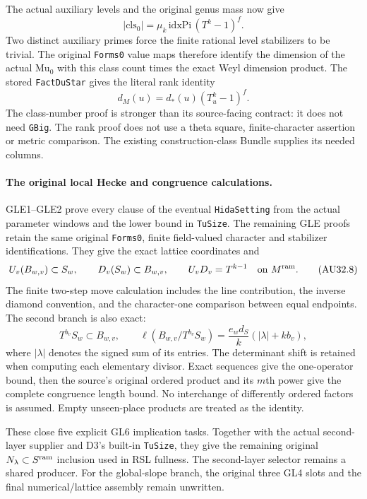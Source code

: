 The actual auxiliary levels and the original genus mass now give
\[
 |\mathrm{cls}_0|=\mu_k\,\mathrm{idxPi}\,(T^k-1)^f.
                                                               \tag{AU32.6}
\]
Two distinct auxiliary primes force the finite rational level
stabilizers to be trivial. The original \texttt{Forms0} value maps
therefore identify the dimension of the actual $\mathrm{Mu}_0$
with this class count times the exact Weyl dimension product.
The stored \texttt{FactDuStar} gives the literal rank identity
\[
                    d_M(u)=d_*(u)(T_u^k-1)^f.
                                                               \tag{AU32.7}
\]
The class-number proof is stronger than its source-facing contract:
it does not need \texttt{GBig}. The rank proof does not use a
theta square, finite-character assertion or metric comparison.
The existing construction-class Bundle supplies its needed columns.

\paragraph{The original local Hecke and congruence calculations.}
GLE1--GLE2 prove every clause of the eventual
\texttt{HidaSetting} from the actual parameter windows and the
lower bound in \texttt{TuSize}. The remaining GLE proofs retain
the same original \texttt{Forms0}, finite field-valued character
and stabilizer identifications. They give the exact lattice
coordinates and
\[
 U_v(B_{w,v})\subset S_w,\qquad D_v(S_w)\subset B_{w,v},
 \qquad U_vD_v=T^{k-1}\quad\hbox{on }M^{\rm ram}.
                                                               \tag{AU32.8}
\]
The finite two-step move calculation includes the line contribution,
the inverse diamond convention, and the character-one comparison
between equal endpoints. The second branch is also exact:
\[
 T^{b_v}S_w\subset B_{w,v},\qquad
 \ell(B_{w,v}/T^{b_v}S_w)
      =\frac{e_wd_S}{k}(|\lambda|+kb_v),
                                                               \tag{AU32.9}
\]
where $|\lambda|$ denotes the signed sum of its entries.
The determinant shift is retained when computing each elementary
divisor. Exact sequences give the one-operator bound, then the
source's original ordered product and its $m$th power give the
complete congruence length bound. No interchange of differently
ordered factors is assumed. Empty unseen-place products are treated
as the identity.

These close five explicit GL6 implication tasks. Together with the
actual second-layer supplier and D3's built-in \texttt{TuSize},
they give the remaining original $N_\lambda\subset S^{\rm ram}$
inclusion used in RSL fullness. The second-layer selector remains
a shared producer. For the global-slope branch, the original three
GL4 slots and the final numerical/lattice assembly remain unwritten.

